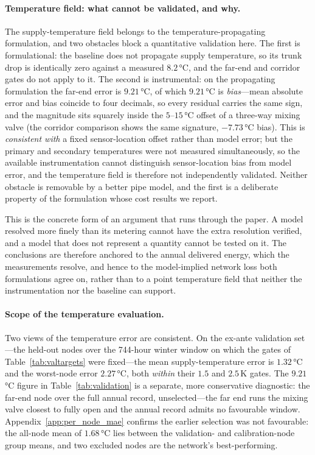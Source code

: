 \paragraph{Temperature field: what cannot be validated, and why.}
The supply-temperature field belongs to the temperature-propagating formulation, and two
obstacles block a quantitative validation here. The first is formulational: the baseline does
not propagate supply temperature, so its trunk drop is identically zero against a measured
$8.2$\,°C, and the far-end and corridor gates do not apply to it. The second is instrumental:
on the propagating formulation the far-end error is $9.21$\,°C, of which $9.21$\,°C is
\emph{bias}---mean absolute error and bias coincide to four decimals, so every residual
carries the same sign, and the magnitude sits squarely inside the $5$--$15$\,°C offset of a
three-way mixing valve (the corridor comparison shows the same signature, $-7.73$\,°C bias).
This is \emph{consistent with} a fixed sensor-location offset rather than model error; but the
primary and secondary temperatures were not measured simultaneously, so the available
instrumentation cannot distinguish sensor-location bias from model error, and the temperature
field is therefore not independently validated. Neither obstacle is removable by a better pipe model, and
the first is a deliberate property of the formulation whose cost results we report.

This is the concrete form of an argument that runs through the paper. A model resolved more
finely than its metering cannot have the extra resolution verified, and a model that does
not represent a quantity cannot be tested on it. The conclusions are therefore anchored to
the annual delivered energy, which the measurements resolve, and hence to the model-implied
network loss both formulations agree on, rather than to a point temperature field that neither
the instrumentation nor the baseline can support.

\paragraph{Scope of the temperature evaluation.}
Two views of the temperature error are consistent. On the ex-ante validation set---the held-out
nodes over the 744-hour winter window on which the gates of Table~\ref{tab:valtargets} were
fixed---the mean supply-temperature error is $1.32$\,°C and the worst-node error $2.27$\,°C,
both \emph{within} their $1.5$ and $2.5$\,K gates. The $9.21$\,°C figure in
Table~\ref{tab:validation} is a separate, more conservative diagnostic: the far-end node over
the full annual record, unselected---the far end runs the mixing valve closest to fully open
and the annual record admits no favourable window. Appendix~\ref{app:per_node_mae}
confirms the earlier selection was not favourable: the all-node mean of $1.68$\,°C lies
between the validation- and calibration-node group means, and two excluded nodes are the
network's best-performing.

